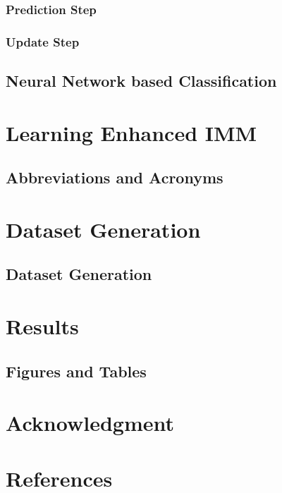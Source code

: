 \documentclass[conference]{IEEEtran}
\begin{document}
\subsubsection{Prediction Step}

\subsubsection{Update Step}

\subsection{Neural Network based Classification}

\section{Learning Enhanced IMM}


\subsection{Abbreviations and Acronyms}\label{AA}


\section{Dataset Generation}

\subsection{Dataset Generation}

\section{Results}


\subsection{Figures and Tables}

\section*{Acknowledgment}


\section*{References}
\end{document}

